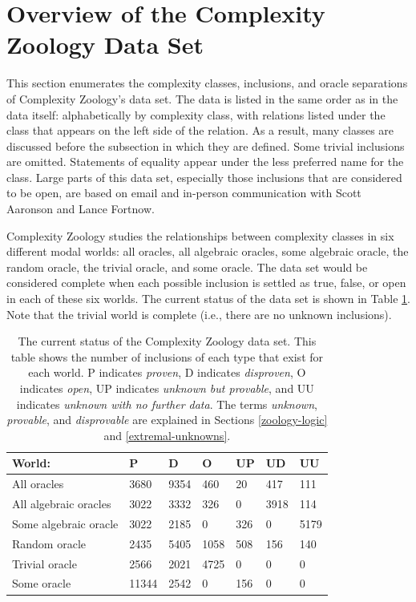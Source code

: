 \section{Overview of the Complexity Zoology Data Set}

This section enumerates the complexity classes, inclusions, and oracle separations
of Complexity Zoology's data set. The data is listed in the same order as in the 
data itself: alphabetically by complexity class, with relations listed under the 
class that appears on the left side of the relation. As a result, many classes are
discussed before the subsection in which they are defined. Some trivial inclusions
are omitted. Statements of equality appear under the less preferred name for the 
class. Large parts of this data set, especially those inclusions that are 
considered to be open, are based on email and in-person communication with Scott 
Aaronson and Lance Fortnow.

Complexity Zoology studies the relationships between complexity classes in six 
different modal worlds: all oracles, all algebraic oracles, some algebraic 
oracle, the random oracle, the trivial oracle, and some oracle. The data set 
would be considered complete when each possible inclusion is settled as true, 
false, or open in each of these six worlds. The current status of the data set is 
shown in Table \ref{data-status}. Note that the trivial world is complete (i.e., 
there are no unknown inclusions).

\begin{table}[]
\begin{tabular}{lllllll}
World:                & P     & D    & O    & UP  & UD   & UU   \\ \hline
All oracles           & 3680  & 9354 & 460  & 20  & 417  & 111  \\
All algebraic oracles & 3022  & 3332 & 326  & 0   & 3918 & 114  \\
Some algebraic oracle & 3022  & 2185 & 0    & 326 & 0    & 5179 \\
Random oracle         & 2435  & 5405 & 1058 & 508 & 156  & 140  \\
Trivial oracle        & 2566  & 2021 & 4725 & 0   & 0    & 0    \\
Some oracle           & 11344 & 2542 & 0    & 156 & 0    & 0   
\end{tabular}
\caption{\label{data-status} The current status of the Complexity Zoology data 
set. This table shows the number of inclusions of each type that exist for each 
world. P indicates \textit{proven}, D indicates \textit{disproven}, O indicates 
\textit{open}, UP indicates \textit{unknown but provable}, and UU indicates 
\textit{unknown with no further data}. The terms \textit{unknown}, 
\textit{provable}, and \textit{disprovable} are explained in Sections 
\ref{zoology-logic} and \ref{extremal-unknowns}.}
\end{table}

